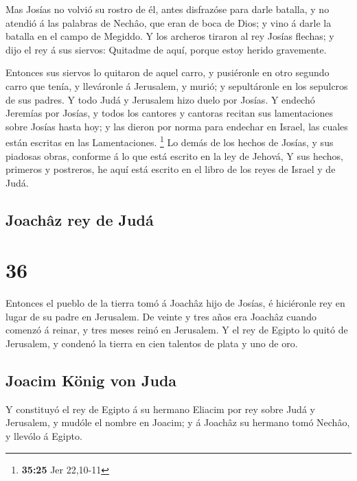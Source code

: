  Mas Josías no volvió su rostro de él, antes disfrazóse
para darle batalla, y no atendió á las palabras de Nechâo, que eran de
boca de Dios; y vino á darle la batalla en el campo de Megiddo.
 Y los archeros tiraron al rey Josías flechas; y dijo el
rey á sus siervos: Quitadme de aquí, porque estoy herido gravemente.

 Entonces sus siervos lo quitaron de aquel carro, y
pusiéronle en otro segundo carro que tenía, y lleváronle á Jerusalem, y
murió; y sepultáronle en los sepulcros de sus padres. Y todo Judá y
Jerusalem hizo duelo por Josías.  Y endechó Jeremías por
Josías, y todos los cantores y cantoras recitan sus lamentaciones sobre
Josías hasta hoy; y las dieron por norma para endechar en Israel, las
cuales están escritas en las Lamentaciones. \footnote{\textbf{35:25} Jer
  22,10-11}  Lo demás de los hechos de Josías, y sus
piadosas obras, conforme á lo que está escrito en la ley de Jehová,
 Y sus hechos, primeros y postreros, he aquí está escrito
en el libro de los reyes de Israel y de Judá.

\hypertarget{joachuxe2z-rey-de-juduxe1}{%
\subsection{Joachâz rey de Judá}\label{joachuxe2z-rey-de-juduxe1}}

\hypertarget{section-35}{%
\section{36}\label{section-35}}

 Entonces el pueblo de la tierra tomó á Joachâz hijo de
Josías, é hiciéronle rey en lugar de su padre en Jerusalem.
 De veinte y tres años era Joachâz cuando comenzó á
reinar, y tres meses reinó en Jerusalem.  Y el rey de
Egipto lo quitó de Jerusalem, y condenó la tierra en cien talentos de
plata y uno de oro.

\hypertarget{joacim-kuxf6nig-von-juda}{%
\subsection{Joacim König von Juda}\label{joacim-kuxf6nig-von-juda}}

 Y constituyó el rey de Egipto á su hermano Eliacim por
rey sobre Judá y Jerusalem, y mudóle el nombre en Joacim; y á Joachâz su
hermano tomó Nechâo, y llevólo á Egipto.

